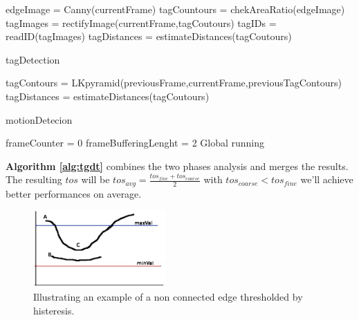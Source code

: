 \documentclass[a4paper]{report}
\begin{document}
\begin{algorithm}[H]
 edgeImage = Canny(currentFrame)\;
 tagCountours = chekAreaRatio(edgeImage)\;
 tagImages = rectifyImage(currentFrame,tagCoutours)\;
 tagIDs = readID(tagImages)\;
 tagDistances = estimateDistances(tagCoutours)\;
 \caption{tagDetection}
 \label{alg:fine}
\end{algorithm}

\begin{algorithm}[H]
 tagContours = LKpyramid(previousFrame,currentFrame,previousTagContours)\;
 tagDistances = estimateDistances(tagCoutours)\;
 \caption{motionDetecion}
 \label{alg:coarse}
\end{algorithm}

\begin{algorithm}[H]
 frameCounter = 0\;
 frameBufferingLenght = 2\;
 Global running\;
 \label{alg:tgdt}
\end{algorithm}

\textbf{Algorithm \ref{alg:tgdt}} combines the two phases analysis and merges the results. The resulting $tos$ will be $ tos_{avg} = \frac{tos_{fine} + tos_{coarse}}{2} $ with $tos_{coarse}<tos_{fine}$ we'll achieve better performances on average.

\begin{figure}
    \centering
    \includegraphics[width=0.45\textwidth]{hysteresis.jpg}
    \caption{Illustrating an example of a non connected edge thresholded by histeresis.}
    \label{fig:hist}
\end{figure}
\end{document}
